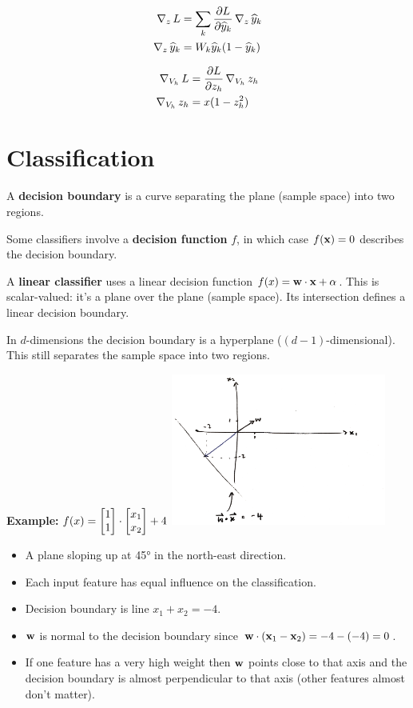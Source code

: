 \begin{align*}
  \operatorname{\nabla}_z L &= \sum_k \frac{\partial L}{\partial \widehat{y}_k} \operatorname{\nabla}_z \widehat{y}_k \\
  \operatorname{\nabla}_z \widehat{y}_k &= W_k \widehat{y}_k (1 - \widehat{y}_k) \\
\end{align*}

\begin{align*}
  \operatorname{\nabla}_{V_h} L &= \frac{\partial L}{\partial z_h} \operatorname{\nabla}_{V_h} z_h \\
  \operatorname{\nabla}_{V_h} z_h &= x(1 - z_h^2)
\end{align*}




\section{Classification}

A \textbf{decision boundary} is a curve separating the plane (sample space)
into two regions.

Some classifiers involve a \textbf{decision function} $f$, in which case
$f(\mathbf x) = 0$ describes the decision boundary.

A \textbf{linear classifier} uses a linear decision function
$f(x) = \mathbf w \cdot \mathbf x + \alpha$. This is scalar-valued: it's a plane over
the plane (sample space). Its intersection defines a linear decision boundary.

In $d$-dimensions the decision boundary is a hyperplane
($(d-1)$-dimensional). This still separates the sample space into two regions.

\textbf{Example:} $f(x) = \begin{bmatrix}1\\1\end{bmatrix} \cdot \begin{bmatrix}x_1\\x_2\end{bmatrix} + 4$
\includegraphics[width=200pt]{img/machine-learning-linear-decision-boundary.png}
\begin{itemize}
\item A plane sloping up at 45° in the north-east direction.
\item Each input feature has equal influence on the classification.
\item Decision boundary is line $x_1 + x_2 = -4$.
\item $\mathbf w$ is normal to the decision boundary since $\mathbf w \cdot (\mathbf x_1 - \mathbf x_2) = -4 - (-4) = 0$.
\item If one feature has a very high weight then $\mathbf w$ points close to that
  axis and the decision boundary is almost perpendicular to that axis (other
  features almost don't matter).
\end{itemize}

